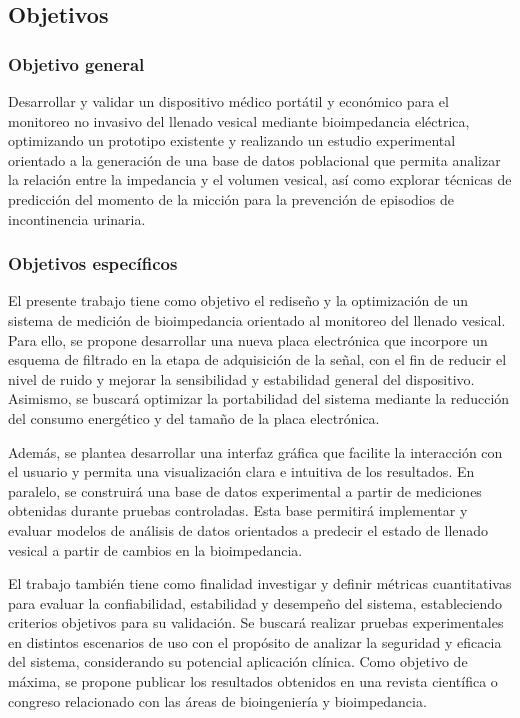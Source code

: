 \documentclass[12pt,a4paper]{article}
\begin{document}
\subsection{Objetivos}

\subsubsection{Objetivo general}

Desarrollar y validar un dispositivo médico portátil y económico para el monitoreo no invasivo del
llenado vesical mediante bioimpedancia eléctrica, optimizando un prototipo existente y realizando un
estudio experimental orientado a la generación de una base de datos poblacional que permita analizar
la relación entre la impedancia y el volumen vesical, así como explorar técnicas de predicción del
momento de la micción para la prevención de episodios de incontinencia urinaria.

\subsubsection{Objetivos específicos}

El presente trabajo tiene como objetivo el rediseño y la optimización de un sistema de medición de
bioimpedancia orientado al monitoreo del llenado vesical. Para ello, se propone desarrollar una nueva
placa electrónica que incorpore un esquema de filtrado en la etapa de adquisición de la señal, con el
fin de reducir el nivel de ruido y mejorar la sensibilidad y estabilidad general del dispositivo.
Asimismo, se buscará optimizar la portabilidad del sistema mediante la reducción del consumo
energético y del tamaño de la placa electrónica.

Además, se plantea desarrollar una interfaz gráfica que facilite la interacción con el usuario y
permita una visualización clara e intuitiva de los resultados. En paralelo, se construirá una base
de datos experimental a partir de mediciones obtenidas durante pruebas controladas. Esta base
permitirá implementar y evaluar modelos de análisis de datos orientados a predecir el estado de
llenado vesical a partir de cambios en la bioimpedancia.

El trabajo también tiene como finalidad investigar y definir métricas cuantitativas para evaluar la
confiabilidad, estabilidad y desempeño del sistema, estableciendo criterios objetivos para su
validación. Se buscará realizar pruebas experimentales en distintos escenarios de uso con el propósito
de analizar la seguridad y eficacia del sistema, considerando su potencial aplicación clínica. Como
objetivo de máxima, se propone publicar los resultados obtenidos en una revista científica o congreso
relacionado con las áreas de bioingeniería y bioimpedancia.
\end{document}
